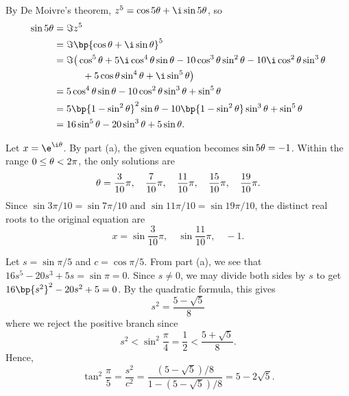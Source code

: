 \begin{solution}
    \begin{ppart}
        By De Moivre's theorem, $z^5 = \cos 5\t + \i \sin 5\t$, so
        \begin{align*}
            \sin 5\t &= \Im z^5\\
            &= \Im \bp{\cos \t + \i \sin \t}^5\\
            &= \Im \big(\cos^5 \t + 5 \i \cos^4 \t \sin \t - 10 \cos^3 \t \sin^2 \t - 10 \i \cos^2 \t \sin^3 \t\\
            &\hspace{3em}+ 5 \cos \t \sin^4 \t + \i \sin^5 \t\big)\\
            &= 5 \cos^4 \t \sin \t - 10 \cos^2 \t \sin^3 \t + \sin^5 \t\\
            &= 5 \bp{1 - \sin^2 \t}^2 \sin \t - 10 \bp{1 - \sin^2 \t} \sin^3 \t + \sin^5 \t\\
            &= 16\sin^5 \t - 20 \sin^3 \t + 5 \sin \t.
        \end{align*}
    \end{ppart}
    \begin{ppart}
        \begin{psubpart}
            Let $x = \e^{\i \t}$. By part (a), the given equation becomes $\sin 5\theta = -1$. Within the range $0 \leq \theta < 2\pi$, the only solutions are \[\theta = \frac3{10}\pi, \quad \frac7{10}\pi, \quad \frac{11}{10}\pi, \quad \frac{15}{10}\pi, \quad \frac{19}{10}\pi.\] Since $\sin{3\pi/10} = \sin{7\pi/10}$ and $\sin{11\pi/10} = \sin{19\pi/10}$, the distinct real roots to the original equation are \[x = \sin\frac3{10}\pi, \quad \sin \frac{11}{10} \pi, \quad -1.\]
        \end{psubpart}
        \begin{psubpart}
            Let $s = \sin{\pi/5}$ and $c = \cos{\pi/5}$. From part (a), we see that $16s^5 - 20s^3 + 5s = \sin \pi = 0$. Since $s \neq 0$, we may divide both sides by $s$ to get $16\bp{s^2}^2 - 20s^2 + 5 = 0$. By the quadratic formula, this gives \[s^2 = \frac{5 - \sqrt{5}}{8}\] where we reject the positive branch since \[s^2 < \sin^2 \frac\pi4 = \frac12 < \frac{5 + \sqrt{5}}{8}.\] Hence, \[\tan^2 \frac\pi5 = \frac{s^2}{c^2} = \frac{(5-\sqrt5)/8}{1 - (5-\sqrt5)/8} = 5 - 2\sqrt5.\]
        \end{psubpart}
    \end{ppart}
\end{solution}

